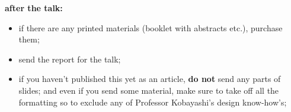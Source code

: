\documentclass[12pt]{article} %
\begin{document}
	\textbf{after the talk:}
	\begin{itemize}
		\item if there are any printed materials (booklet with abstracts etc.), purchase them;
        \item send the report for the talk;
        \item if you haven't published this yet as an article, \textbf{do not} send any parts of slides;
            and even if you send some material, make sure to take off all the formatting so to exclude
            any of Professor Kobayashi's design know-how's;
	\end{itemize}
\end{document}
